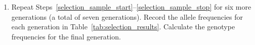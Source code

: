 \documentclass[12pt]{exam}
\newcommand{\allele}[1]{$#1$}
\begin{document}
\begin{questions}
\begin{enumerate}
	\item Repeat Steps~\ref{selection_sample_start}–\ref{selection_sample_stop} for six more generations (a total of seven generations). Record the allele frequencies for each generation in Table~\ref{tab:selection_results}. Calculate the genotype frequencies for the final generation. 
	
\end{enumerate}

%
%


\end{questions}
\end{document}
